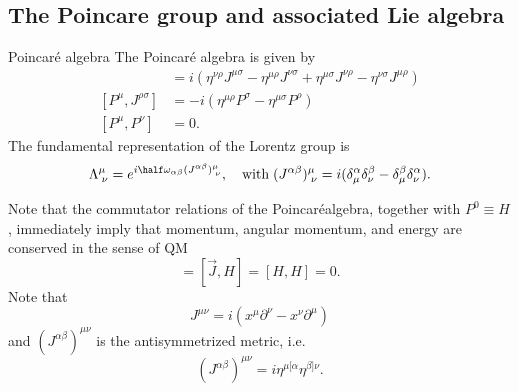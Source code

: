 \subsection{The Poincare group and associated Lie algebra}
\begin{mybox}{Poincaré algebra}
	The Poincaré algebra is given by
	\begin{align}
		[J^{\mu \nu} , J^{\rho \sigma}] &= i \left( \eta^{\nu \rho} J^{\mu \sigma} - \eta^{\mu\rho} J^{\nu\sigma} +\eta^{\mu \sigma} J^{\nu\rho} -\eta^{\nu\sigma} J^{\mu\rho} \right)\\
		[P^\mu,J^{ \rho \sigma}]&= -i \left(\eta^{\mu \rho} P^\sigma - \eta^{\mu \sigma} P^\rho\right)\\
		[P^\mu,P^\nu]&=0.
	\end{align}
	The fundamental representation of the Lorentz group is
	\begin{equation}
	\Lambda^\mu_{\;\nu} =e^{i \half \omega_{\alpha \beta} (J^{\alpha \beta})^\mu_{\;\nu}}, \quad \mathrm{with}\; (J^{\alpha \beta})^\mu_{\;\nu} = i (\delta^\alpha_\mu \delta^\beta_\nu -\delta^\beta_\mu \delta^\alpha_\nu ).
	\end{equation}
\end{mybox}
Note that the commutator relations of the Poincaréalgebra, together with $P^0 ≡ H$, immediately
imply that momentum, angular momentum, and energy are conserved in the sense of QM
\begin{equation}
[\vec{P},H]=[\vec{J},H] = [H,H] =0.
\end{equation}
Note that 
\begin{equation}
J^{\mu\nu}= i(x^\mu \partial^\nu - x^\nu \partial^\mu )
\end{equation}
and $(J^{\alpha \beta} )^{\mu\nu}$ is the antisymmetrized metric, i.e.
\begin{equation}
(J^{\alpha \beta})^{\mu \nu} = i \eta^{\mu [\alpha}\eta^{\beta]\nu}.
\end{equation}